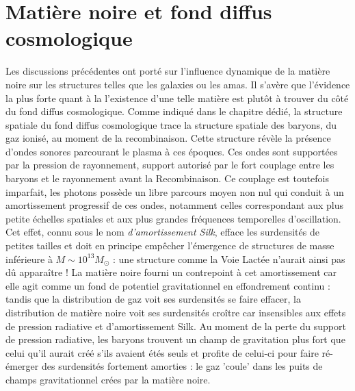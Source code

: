 \section{Matière noire et fond diffus cosmologique}

Les discussions précédentes ont porté sur l'influence dynamique de la matière noire sur les structures telles que les galaxies ou les amas. Il s'avère que l'évidence la plus forte quant à la l'existence d'une telle matière est plutôt à trouver du côté du fond diffus cosmologique. Comme indiqué dans le chapitre dédié, la structure spatiale du fond diffus cosmologique trace la structure spatiale des baryons, du gaz ionisé, au moment de la recombinaison. Cette structure révèle la présence d'ondes sonores parcourant le plasma à ces époques. Ces ondes sont supportées par la pression de rayonnement, support autorisé par le fort couplage entre les baryons et le rayonnement avant la Recombinaison. Ce couplage est toutefois imparfait, les photons possède un libre parcours moyen non nul qui conduit à un amortissement progressif de ces ondes, notamment celles correspondant aux plus petite échelles spatiales et aux plus grandes fréquences temporelles d'oscillation. Cet effet, connu sous le nom \textit{d'amortissement Silk},  efface les surdensités de petites tailles et doit en principe empêcher l'émergence de structures de masse inférieure à $M\sim 10^{13} M_\odot$ : une structure comme la Voie Lactée n'aurait ainsi pas dû apparaître ! La matière noire fourni un contrepoint à cet amortissement car elle agit comme un fond de potentiel gravitationnel en effondrement continu : tandis que la distribution de gaz voit ses surdensités se faire effacer, la distribution de matière noire voit ses surdensités croître car insensibles aux effets de pression radiative et  d'amortissement Silk. Au moment de la perte du support de pression radiative, les baryons trouvent un champ de gravitation plus fort que celui qu'il aurait créé s'ils avaient étés seuls et profite de celui-ci pour faire ré-émerger des surdensités fortement amorties : le gaz 'coule' dans les puits de champs gravitationnel crées par la matière noire. 

